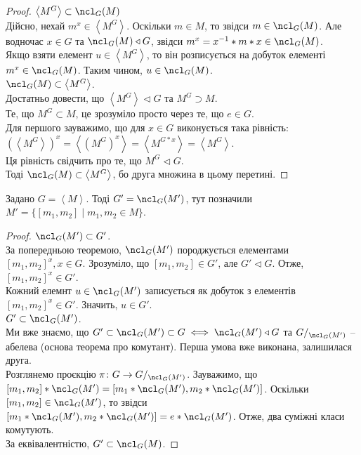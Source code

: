 \documentclass{math_library}
\begin{document}
\begin{proof}
$\left<M^G \right> \subset \ncl_G(M)$\\
Дійсно, нехай $m^x \in \left<M^G\right>$. Оскільки $m \in M$, то звідси $m \in \ncl_G(M)$. Але водночас $x \in G$ та $\ncl_G(M) \triangleleft G$, звідси $m^x = x^{-1}*m*x \in \ncl_G(M)$.\\
Якщо взяти елемент $u \in \left< M^G \right>$, то він розписується на добуток елементі $m^x \in \ncl_G(M)$. Таким чином, $u \in \ncl_G(M)$.
\bigskip \\
$\ncl_G(M) \subset \left< M^G \right>$.\\
Достатньо довести, що $\left< M^G \right> \triangleleft G$ та $M^G \supset M$.\\
Те, що $M^G \subset M$, це зрозуміло просто через те, що $e \in G$.\\
Для першого зауважимо, що для $x \in G$ виконується така рівність:\\
$\left(\left< M^G \right>\right)^x = \left< (M^{G})^x \right> = \left< M^{G*x} \right> = \left< M^G \right>$.\\
Ця рівність свідчить про те, що $M^G \triangleleft G$.\\
Тоді $\ncl_G(M) \subset \left<M^G\right>$, бо друга множина в цьому перетині.
\end{proof}

\begin{theorem}
Задано $G = \left< M \right>$. Тоді $G' = \ncl_G(M')$, тут позначили \\
$M' = \{ [m_1,m_2] \mid m_1,m_2 \in M\}$.
\end{theorem}

\begin{proof}
$\ncl_G(M') \subset G'$.\\
За попередньою теоремою, $\ncl_G(M')$ породжується елементами $[m_1,m_2]^x, x \in G$. Зрозуміло, що $[m_1,m_2] \in G'$, але $G' \triangleleft G$. Отже, $[m_1,m_2]^x \in G'$.\\
Кожний елемнт $u \in \ncl_G(M')$ записується як добуток з елементів $[m_1,m_2]^x \in G'$. Значить, $u \in G'$.
\bigskip \\
$G' \subset \ncl_G(M')$.\\
Ми вже знаємо, що $G' \subset \ncl_G(M') \subset G \iff \ncl_G(M') \triangleleft G$ та $G/_{\ncl_G(M')}$ -- абелева (основа теорема про комутант). Перша умова вже виконана, залишилася друга.\\
Розглянемо проєкцію $\pi \colon G \to G/_{\ncl_G(M')}$. Зауважимо, що\\
$[m_1,m_2]*\ncl_G(M') = [m_1*\ncl_G(M'),m_2*\ncl_G(M')]$. Оскільки $[m_1,m_2] \in \ncl_G(M')$, то звідси $[m_1*\ncl_G(M'),m_2*\ncl_G(M')] = e*\ncl_G(M')$. Отже, два суміжні класи комутують.\\
За еквівалентністю, $G' \subset \ncl_G(M)$.
\end{proof}
\end{document}
